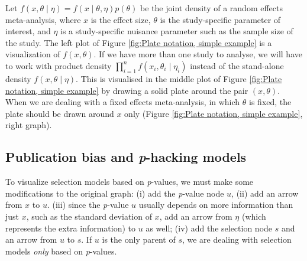 \documentclass{article}
\theoremstyle{plain}
\theoremstyle{definition}
\begin{document}
Let $f\left(x,\theta\mid\eta\right)=f\left(x\mid\theta,\eta\right)p\left(\theta\right)$
be the joint density of a random effects meta-analysis, where $x$ is the effect size, $\theta$ is the study-specific parameter of interest, and $\eta$ is a study-specific nuisance parameter such as the sample size of the study. The left plot of Figure \ref{fig:Plate notation, simple example} is a visualization of $f\left(x,\theta\right)$. If we have more than one study to analyse, we will have to work with product density $\prod_{i=1}^{n}f\left(x_{i},\theta_{i}\mid\eta_{i}\right)$ instead of the stand-alone density $f\left(x,\theta\mid\eta\right)$. This is visualised in the middle plot of Figure \ref{fig:Plate notation, simple example}  by drawing a solid plate around the pair $\left(x,\theta\right)$. When we are dealing with a fixed effects meta-analysis, in which $\theta$ is fixed, the plate should be drawn around $x$ only (Figure \ref{fig:Plate notation, simple example}, right graph). 


\subsection{Publication bias and \textit{p}-hacking models\label{subsec:Selection sets, meta analysis}}

To visualize selection models based on \textit{p}-values, we must make some modifications to the original graph: (i) add the \textit{p}-value node $u$, (ii) add an arrow from $x$ to $u$. (iii) since the \textit{p}-value $u$ usually depends on more information than just $x$, such as the standard deviation of $x$, add an arrow from $\eta$ (which represents the extra information) to $u$ as well; (iv) add the selection node $s$ and an arrow from $u$ to $s$. If $u$ is the only parent of $s$, we are dealing with selection models \emph{only} based on
\emph{p}-values. 
\end{document}
